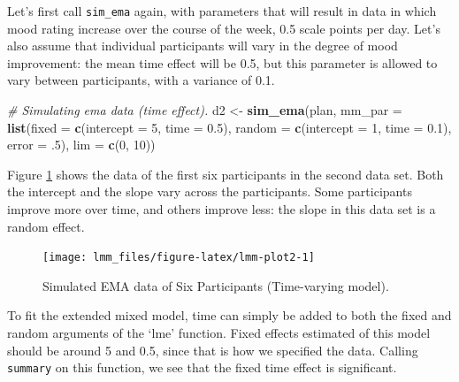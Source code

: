 \documentclass[]{book}
\newenvironment{Shaded}{\begin{snugshade}}{\end{snugshade}}
\newcommand{\KeywordTok}[1]{\textcolor[rgb]{0.13,0.29,0.53}{\textbf{#1}}}
\newcommand{\DataTypeTok}[1]{\textcolor[rgb]{0.13,0.29,0.53}{#1}}
\newcommand{\DecValTok}[1]{\textcolor[rgb]{0.00,0.00,0.81}{#1}}
\newcommand{\FloatTok}[1]{\textcolor[rgb]{0.00,0.00,0.81}{#1}}
\newcommand{\StringTok}[1]{\textcolor[rgb]{0.31,0.60,0.02}{#1}}
\newcommand{\CommentTok}[1]{\textcolor[rgb]{0.56,0.35,0.01}{\textit{#1}}}
\newcommand{\NormalTok}[1]{#1}
\begin{document}
Let's first call \texttt{sim\_ema} again, with parameters that will
result in data in which mood rating increase over the course of the
week, 0.5 scale points per day. Let's also assume that individual
participants will vary in the degree of mood improvement: the mean time
effect will be 0.5, but this parameter is allowed to vary between
participants, with a variance of 0.1.

\begin{Shaded}
\begin{Highlighting}[]
\CommentTok{# Simulating ema data (time effect).}
\NormalTok{d2 <-}\StringTok{ }\KeywordTok{sim_ema}\NormalTok{(plan, }
              \DataTypeTok{mm_par =} \KeywordTok{list}\NormalTok{(}\DataTypeTok{fixed  =} \KeywordTok{c}\NormalTok{(}\DataTypeTok{intercept =} \DecValTok{5}\NormalTok{, }\DataTypeTok{time =} \FloatTok{0.5}\NormalTok{),}
                            \DataTypeTok{random =} \KeywordTok{c}\NormalTok{(}\DataTypeTok{intercept =} \DecValTok{1}\NormalTok{, }\DataTypeTok{time =} \FloatTok{0.1}\NormalTok{),}
                            \DataTypeTok{error =}\NormalTok{ .}\DecValTok{5}\NormalTok{),}
              \DataTypeTok{lim =} \KeywordTok{c}\NormalTok{(}\DecValTok{0}\NormalTok{, }\DecValTok{10}\NormalTok{))}
\end{Highlighting}
\end{Shaded}

Figure \ref{fig:lmm-plot2} shows the data of the first six participants
in the second data set. Both the intercept and the slope vary across the
participants. Some participants improve more over time, and others
improve less: the slope in this data set is a random effect.

\begin{figure}

{\centering \texttt{[image: lmm\_files/figure-latex/lmm-plot2-1]} 

}

\caption{Simulated EMA data of Six Participants (Time-varying model).}\label{fig:lmm-plot2}
\end{figure}

To fit the extended mixed model, time can simply be added to both the
fixed and random arguments of the `lme' function. Fixed effects
estimated of this model should be around 5 and 0.5, since that is how we
specified the data. Calling \texttt{summary} on this function, we see
that the fixed time effect is significant.
\end{document}
